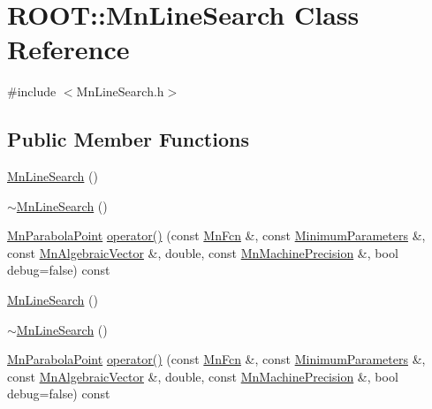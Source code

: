 \hypertarget{classROOT_1_1Minuit2_1_1MnLineSearch}{}\section{R\+O\+OT\+:\+:Mn\+Line\+Search Class Reference}
\label{classROOT_1_1Minuit2_1_1MnLineSearch}


{\ttfamily \#include $<$Mn\+Line\+Search.\+h$>$}

\subsection*{Public Member Functions}
\begin{DoxyCompactItemize}
\item 
\mbox{\hyperlink{classROOT_1_1Minuit2_1_1MnLineSearch_ac8e8d450c628b3af3becdfc1badd0180}{Mn\+Line\+Search}} ()
\item 
\mbox{\hyperlink{classROOT_1_1Minuit2_1_1MnLineSearch_a84ecd0790b8822023e2e1d7abb102f6c}{$\sim$\+Mn\+Line\+Search}} ()
\item 
\mbox{\hyperlink{classROOT_1_1Minuit2_1_1MnParabolaPoint}{Mn\+Parabola\+Point}} \mbox{\hyperlink{classROOT_1_1Minuit2_1_1MnLineSearch_a4caf80e70d50f3bfa149d28836d26a95}{operator()}} (const \mbox{\hyperlink{classROOT_1_1Minuit2_1_1MnFcn}{Mn\+Fcn}} \&, const \mbox{\hyperlink{classROOT_1_1Minuit2_1_1MinimumParameters}{Minimum\+Parameters}} \&, const \mbox{\hyperlink{namespaceROOT_1_1Minuit2_a62ed97730a1ca8d3fbaec64a19aa11c9}{Mn\+Algebraic\+Vector}} \&, double, const \mbox{\hyperlink{classROOT_1_1Minuit2_1_1MnMachinePrecision}{Mn\+Machine\+Precision}} \&, bool debug=false) const
\item 
\mbox{\hyperlink{classROOT_1_1Minuit2_1_1MnLineSearch_ac8e8d450c628b3af3becdfc1badd0180}{Mn\+Line\+Search}} ()
\item 
\mbox{\hyperlink{classROOT_1_1Minuit2_1_1MnLineSearch_a84ecd0790b8822023e2e1d7abb102f6c}{$\sim$\+Mn\+Line\+Search}} ()
\item 
\mbox{\hyperlink{classROOT_1_1Minuit2_1_1MnParabolaPoint}{Mn\+Parabola\+Point}} \mbox{\hyperlink{classROOT_1_1Minuit2_1_1MnLineSearch_a4caf80e70d50f3bfa149d28836d26a95}{operator()}} (const \mbox{\hyperlink{classROOT_1_1Minuit2_1_1MnFcn}{Mn\+Fcn}} \&, const \mbox{\hyperlink{classROOT_1_1Minuit2_1_1MinimumParameters}{Minimum\+Parameters}} \&, const \mbox{\hyperlink{namespaceROOT_1_1Minuit2_a62ed97730a1ca8d3fbaec64a19aa11c9}{Mn\+Algebraic\+Vector}} \&, double, const \mbox{\hyperlink{classROOT_1_1Minuit2_1_1MnMachinePrecision}{Mn\+Machine\+Precision}} \&, bool debug=false) const

\end{DoxyCompactItemize}
